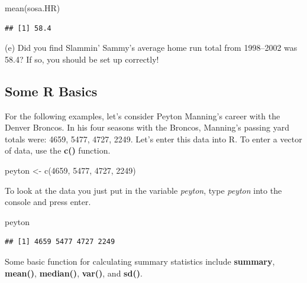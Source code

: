 \documentclass[
  11pt,
]{book}
\newenvironment{Shaded}{\begin{snugshade}}{\end{snugshade}}
\newcommand{\DecValTok}[1]{\textcolor[rgb]{0.00,0.00,0.81}{#1}}
\newcommand{\FunctionTok}[1]{\textcolor[rgb]{0.00,0.00,0.00}{#1}}
\newcommand{\NormalTok}[1]{#1}
\newcommand{\OtherTok}[1]{\textcolor[rgb]{0.56,0.35,0.01}{#1}}
\theoremstyle{definition}
\theoremstyle{definition}
\theoremstyle{definition}
\theoremstyle{definition}
\theoremstyle{remark}
\begin{document}
\begin{Shaded}
\begin{Highlighting}[]
\FunctionTok{mean}\NormalTok{(sosa.HR)}
\end{Highlighting}
\end{Shaded}

\begin{verbatim}
## [1] 58.4
\end{verbatim}

\noindent (e) Did you find Slammin' Sammy's average home run total from 1998--2002 was 58.4? If so, you should be set up correctly!

\newpage

\hypertarget{some-r-basics}{%
\subsection*{Some R Basics}\label{some-r-basics}}

For the following examples, let's consider Peyton Manning's career with the Denver Broncos. In his four seasons with the Broncos, Manning's passing yard totals were: 4659, 5477, 4727, 2249. Let's enter this data into R. To enter a vector of data, use the \textbf{c()} function.

\begin{Shaded}
\begin{Highlighting}[]
\NormalTok{peyton }\OtherTok{\textless{}{-}} \FunctionTok{c}\NormalTok{(}\DecValTok{4659}\NormalTok{, }\DecValTok{5477}\NormalTok{, }\DecValTok{4727}\NormalTok{, }\DecValTok{2249}\NormalTok{)}
\end{Highlighting}
\end{Shaded}

To look at the data you just put in the variable \emph{peyton}, type \emph{peyton} into the console and press enter.

\begin{Shaded}
\begin{Highlighting}[]
\NormalTok{peyton}
\end{Highlighting}
\end{Shaded}

\begin{verbatim}
## [1] 4659 5477 4727 2249
\end{verbatim}

Some basic function for calculating summary statistics include \textbf{summary}, \textbf{mean()}, \textbf{median()}, \textbf{var()}, and \textbf{sd()}.
\end{document}
